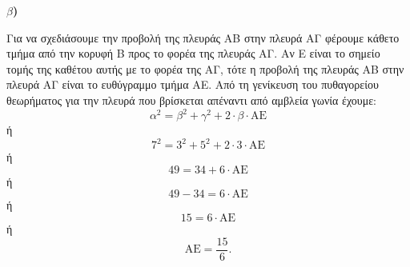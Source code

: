 \textbf{$\beta$)}
\begin{figure} %
    \centering
\end{figure}
Για να σχεδιάσουμε την προβολή της πλευράς ΑΒ στην πλευρά ΑΓ φέρουμε κάθετο τμήμα από την κορυφή Β προς το φορέα της πλευράς ΑΓ. Αν Ε είναι το σημείο τομής της καθέτου αυτής με το φορέα της ΑΓ, τότε η προβολή της πλευράς ΑΒ στην πλευρά ΑΓ είναι το ευθύγραμμο τμήμα ΑΕ. Από τη γενίκευση του πυθαγορείου θεωρήματος για την πλευρά που βρίσκεται απέναντι από αμβλεία γωνία έχουμε:
\[\alpha^2 = \beta^2 + \gamma^2 + 2 \cdot \beta \cdot \text{AE}\]
ή
\[7^2 = 3^2 + 5^2 + 2 \cdot 3 \cdot \text{AE}\]
ή
\[49 = 34 + 6 \cdot \text{AE}\]
ή
\[49 - 34 = 6 \cdot \text{AE}\]
ή
\[15 = 6 \cdot \text{AE}\]
ή
\[\text{AE} = \frac{15}{6}.\]